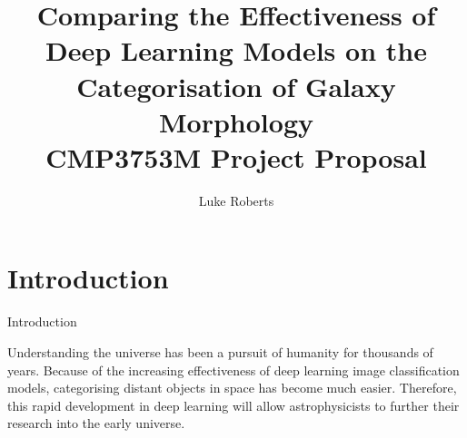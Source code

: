\documentclass[runningheads]{llncs}
\begin{document}
\title{
    Comparing the Effectiveness of Deep Learning Models on the Categorisation of Galaxy Morphology
    \\ CMP3753M Project Proposal
}

\author{Luke Roberts}


\maketitle

\section{Introduction}
%
%
%
%
%

Introduction

Understanding the universe has been a pursuit of humanity for thousands of
years. Because of the increasing effectiveness of deep learning image
classification models, categorising distant objects in space has become much
easier. Therefore, this rapid development in deep learning will allow
astrophysicists to further their research into the early universe.
\end{document}
